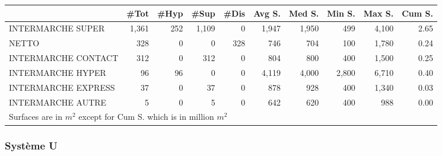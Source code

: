 \documentclass[11pt]{article}
\begin{document}
\begin{table}[H]
\footnotesize
\setlength{\tabcolsep}{2pt}

\begin{tabular}{lrrrrrrrrr}
\toprule
{} &       \#Tot &       \#Hyp &       \#Sup &       \#Dis &     Avg S. &     Med S. &     Min S. &     Max S. &     Cum S. \\
\midrule
INTERMARCHE SUPER   &      1,361 &        252 &      1,109 &          0 &      1,947 &      1,950 &        499 &      4,100 &       2.65 \\
NETTO               &        328 &          0 &          0 &        328 &        746 &        704 &        100 &      1,780 &       0.24 \\
INTERMARCHE CONTACT &        312 &          0 &        312 &          0 &        804 &        800 &        400 &      1,500 &       0.25 \\
INTERMARCHE HYPER   &         96 &         96 &          0 &          0 &      4,119 &      4,000 &      2,800 &      6,710 &       0.40 \\
INTERMARCHE EXPRESS &         37 &          0 &         37 &          0 &        878 &        928 &        400 &      1,340 &       0.03 \\
INTERMARCHE AUTRE   &          5 &          0 &          5 &          0 &        642 &        620 &        400 &        988 &       0.00 \\
\bottomrule
\multicolumn{10}{l}{\footnotesize Surfaces are in $m^2$ except for Cum S. which is in million $m^2$} \\
\end{tabular}

\end{table}

\subsubsection{Système U}
\end{document}
